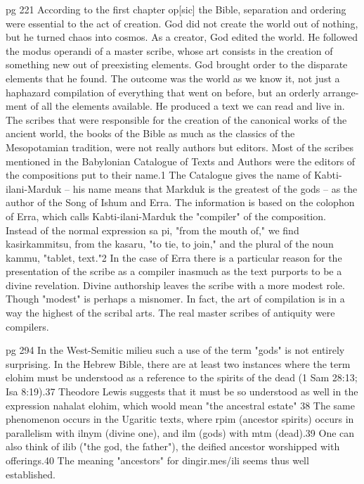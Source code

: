 \documentclass[11pt]{article}
\begin{document}
{pg 221 According to the first chapter op[sic] the Bible, separation and ordering were essential to the act of creation. God did not create the world out of nothing, but he turned chaos into cosmos. As a creator, God edited the world. He followed the modus operandi of a master scribe, whose art consists in the creation of something new out of preexisting elements. God brought order to the disparate elements that he found. The outcome was the world as we know it, not just a haphazard compilation of everything that went on before, but an orderly arrange-ment of all the elements available. He produced a text we can read and live in. The scribes that were responsible for the creation of the canonical works of the ancient world, the books of the Bible as much as the classics of the Mesopotamian tradition, were not really authors but editors. Most of the scribes mentioned in the Babylonian Catalogue of Texts and Authors were the editors of the compositions put to their name.1 The Catalogue gives the name of Kabti-ilani-Marduk -- his name means that Markduk is the greatest of the gods -- as the author of the Song of Ishum and Erra. The information is based on the colophon of Erra, which calls Kabti-ilani-Marduk the "compiler" of the composition. Instead of the normal expression sa pi, "from the mouth of," we find kasirkammitsu, from the kasaru, "to tie, to join," and the plural of the noun kammu, "tablet, text."2 In the case of Erra there is a particular reason for the presentation of the scribe as a compiler inasmuch as the text purports to be a divine revelation. Divine authorship leaves the scribe with a more modest role. Though "modest" is perhaps a misnomer. In fact, the art of compilation is in a way the highest of the scribal arts. The real master scribes of antiquity were compilers. 

pg 294
In the West-Semitic milieu such a use of the term "gods" is not entirely surprising. In the Hebrew Bible, there are at least two instances where the term elohim must be understood as a reference to the spirits of the dead (1 Sam 28:13; Isa 8:19).37 Theodore Lewis suggests that it must be so understood as well in the expression nahalat elohim, which woold mean "the ancestral estate" 38 The same phenomenon occurs in the Ugaritic texts, where rpim (ancestor spirits) occurs in parallelism with ilnym (divine one), and ilm (gods) with mtm (dead).39 One can also think of ilib ("the god, the father"), the deified ancestor worshipped with offerings.40 The meaning "ancestors" for dingir.mes/ili seems thus well established.

}
\end{document}
